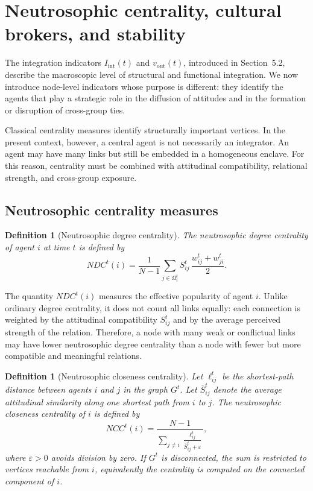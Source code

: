 \documentclass[11pt,a4paper]{article}
\newtheorem{definition}[theorem]{Definition}
\begin{document}
\section{Neutrosophic centrality, cultural brokers, and stability}

The integration indicators $I_{\mathrm{int}}(t)$ and $v_{\mathrm{out}}(t)$,
introduced in Section~5.2, describe the macroscopic level of structural and
functional integration. We now introduce node-level indicators whose purpose is
different: they identify the agents that play a strategic role in the diffusion of
attitudes and in the formation or disruption of cross-group ties.

Classical centrality measures identify structurally important vertices. In the
present context, however, a central agent is not necessarily an integrator. An
agent may have many links but still be embedded in a homogeneous enclave. For
this reason, centrality must be combined with attitudinal compatibility,
relational strength, and cross-group exposure.

\subsection{Neutrosophic centrality measures}

\begin{definition}[Neutrosophic degree centrality]
	The \emph{neutrosophic degree centrality} of agent $i$ at time $t$ is defined by
	\[
	NDC^t(i)
	=
	\frac{1}{N-1}
	\sum_{j\in\Omega_i^t}
	S_{ij}^t\,
	\frac{w_{ij}^t+w_{ji}^t}{2}.
	\]
\end{definition}

The quantity $NDC^t(i)$ measures the effective popularity of agent $i$. Unlike
ordinary degree centrality, it does not count all links equally: each connection is
weighted by the attitudinal compatibility $S_{ij}^t$ and by the average perceived
strength of the relation. Therefore, a node with many weak or conflictual links
may have lower neutrosophic degree centrality than a node with fewer but more
compatible and meaningful relations.

\begin{definition}[Neutrosophic closeness centrality]
	Let $\ell_{ij}^t$ be the shortest-path distance between agents $i$ and $j$ in
	the graph $G^t$. Let $\overline S_{ij}^t$ denote the average attitudinal
	similarity along one shortest path from $i$ to $j$. The \emph{neutrosophic
		closeness centrality} of $i$ is defined by
	\[
	NCC^t(i)
	=
	\frac{N-1}
	{
		\displaystyle
		\sum_{j\neq i}
		\frac{\ell_{ij}^t}{\overline S_{ij}^t+\varepsilon}
	},
	\]
	where $\varepsilon>0$ avoids division by zero. If $G^t$ is disconnected, the sum is restricted to vertices reachable from $i$, equivalently the centrality is computed on the connected component of $i$.
\end{definition}
\end{document}
